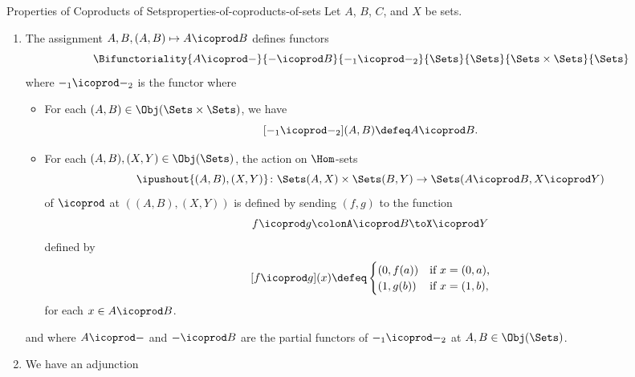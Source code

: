 \begin{proposition}{Properties of Coproducts of Sets}{properties-of-coproducts-of-sets}%
    Let $A$, $B$, $C$, and $X$ be sets.
    \begin{enumerate}
        \item\label{properties-of-coproducts-of-sets-functoriality}The assignment $A,B,(A,B)\mapsto A\icoprod B$ defines functors
            \[
                \Bifunctoriality{A\icoprod-}{-\icoprod B}{-_{1}\icoprod-_{2}}{\Sets}{\Sets}{\Sets\times\Sets}{\Sets}%
            \]%
            where $-_{1}\icoprod-_{2}$ is the functor where
            \begin{itemize}
                \item{}For each $(A,B)\in\Obj(\Sets\times\Sets)$, we have
                    \[
                        [-_{1}\icoprod-_{2}](A,B)%
                        \defeq
                        A\icoprod B.%
                    \]%
                \item{}For each $(A,B),(X,Y)\in\Obj(\Sets)$, the action on $\Hom$-sets
                    \[
                        \ipushout{(A,B),(X,Y)}
                        \colon
                        \Sets(A,X)\times\Sets(B,Y)%
                        \to%
                        \Sets(A\icoprod B,X\icoprod Y)%
                    \]%
                    of $\icoprod$ at $((A,B),(X,Y))$ is defined by sending $(f,g)$ to the function
                    \[
                        f\icoprod g%
                        \colon%
                        A\icoprod B%
                        \to%
                        X\icoprod Y%
                    \]%
                    defined by
                    \[
                        [f\icoprod g](x)%
                        \defeq%
                        \begin{cases}
                            (0,f(a)) &\text{if $x=(0,a)$,}\\%
                            (1,g(b)) &\text{if $x=(1,b)$,}%
                        \end{cases}
                    \]%
                    for each $x\in A\icoprod B$.
            \end{itemize}
            and where $A\icoprod-$ and $-\icoprod B$ are the partial functors of $-_{1}\icoprod-_{2}$ at $A,B\in\Obj(\Sets)$.
        \item\label{properties-of-coproducts-of-sets-adjointness}We have an adjunction

\end{enumerate}
\end{proposition}
